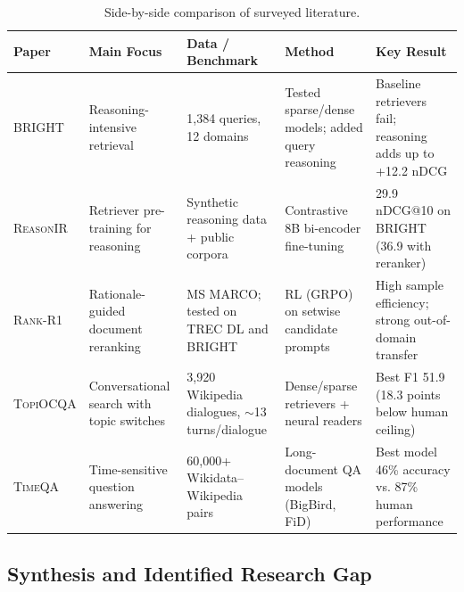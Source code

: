 \begin{table}[t]
\centering
\small
\caption{Side-by-side comparison of surveyed literature.}
\label{tab:lit_comparison}
\begin{tabular}{lp{3.5cm}p{3.5cm}p{3.2cm}p{3.5cm}}
\toprule
\textbf{Paper} & \textbf{Main Focus} & \textbf{Data / Benchmark} & \textbf{Method} & \textbf{Key Result} \\
\midrule
\textsc{BRIGHT} \cite{bright} & Reasoning-intensive retrieval & 1,384 queries, 12 domains & Tested sparse/dense models; added query reasoning & Baseline retrievers fail; reasoning adds up to +12.2 nDCG \\
\addlinespace
\textsc{ReasonIR} \cite{reasonir} & Retriever pre-training for reasoning & Synthetic reasoning data + public corpora & Contrastive 8B bi-encoder fine-tuning & 29.9 nDCG@10 on \textsc{BRIGHT} (36.9 with reranker) \\
\addlinespace
\textsc{Rank-R1} \cite{rankr1} & Rationale-guided document reranking & MS MARCO; tested on TREC DL and \textsc{BRIGHT} & RL (GRPO) on setwise candidate prompts & High sample efficiency; strong out-of-domain transfer \\
\addlinespace
\textsc{TopiOCQA} \cite{topiocqa} & Conversational search with topic switches & 3,920 Wikipedia dialogues, $\sim$13 turns/dialogue & Dense/sparse retrievers + neural readers & Best F1 51.9 (18.3 points below human ceiling) \\
\addlinespace
\textsc{TimeQA} \cite{timeqa} & Time-sensitive question answering & 60,000+ Wikidata--Wikipedia pairs & Long-document QA models (BigBird, FiD) & Best model 46\% accuracy vs. 87\% human performance \\
\bottomrule
\end{tabular}
\end{table}

\subsection{Synthesis and Identified Research Gap}

